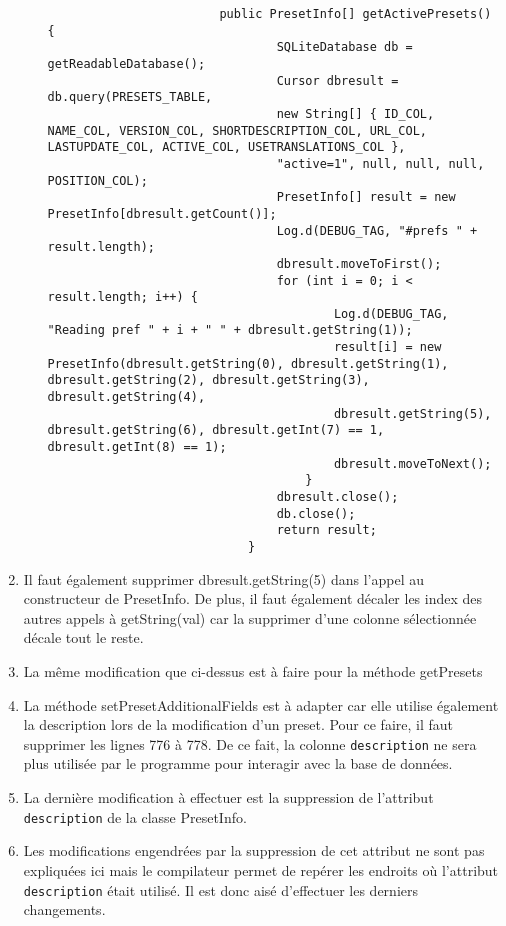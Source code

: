 \begin{enumerate}
\begin{itemize}
\begin{verbatim}
                        public PresetInfo[] getActivePresets() {
                                SQLiteDatabase db = getReadableDatabase();
                                Cursor dbresult = db.query(PRESETS_TABLE,
                                new String[] { ID_COL, NAME_COL, VERSION_COL, SHORTDESCRIPTION_COL, URL_COL, LASTUPDATE_COL, ACTIVE_COL, USETRANSLATIONS_COL },
                                "active=1", null, null, null, POSITION_COL);
                                PresetInfo[] result = new PresetInfo[dbresult.getCount()];
                                Log.d(DEBUG_TAG, "#prefs " + result.length);
                                dbresult.moveToFirst();
                                for (int i = 0; i < result.length; i++) {
                                        Log.d(DEBUG_TAG, "Reading pref " + i + " " + dbresult.getString(1));
                                        result[i] = new PresetInfo(dbresult.getString(0), dbresult.getString(1), dbresult.getString(2), dbresult.getString(3), dbresult.getString(4),
                                        dbresult.getString(5), dbresult.getString(6), dbresult.getInt(7) == 1, dbresult.getInt(8) == 1);
                                        dbresult.moveToNext();
                                    }
                                dbresult.close();
                                db.close();
                                return result;
                            }
                    \end{verbatim}
          \end{itemize}
    \item Il faut également supprimer dbresult.getString(5) dans l'appel au constructeur de PresetInfo. De plus, il faut également décaler les index des autres appels à getString(val) car la supprimer d'une colonne sélectionnée décale tout le reste.
    \item La même modification que ci-dessus est à faire pour la méthode getPresets

    \item La méthode setPresetAdditionalFields est à adapter car elle utilise également la description lors de la modification d'un preset. Pour ce faire, il faut supprimer les lignes 776 à 778. De ce fait, la colonne \texttt{description} ne sera plus utilisée par le programme pour interagir avec la base de données.

    \item La dernière modification à effectuer est la suppression de l'attribut \texttt{description} de la classe PresetInfo.

    \item Les modifications engendrées par la suppression de cet attribut ne sont pas expliquées ici mais le compilateur permet de repérer les endroits où l'attribut \texttt{description} était utilisé. Il est donc aisé d'effectuer les derniers changements.
\end{enumerate}